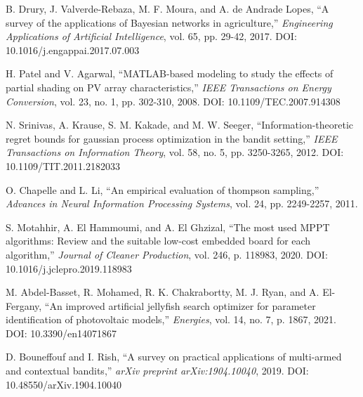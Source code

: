 \documentclass[12pt,a4paper]{article}
\begin{document}
\begin{thebibliography}{16}
B. Drury, J. Valverde-Rebaza, M. F. Moura, and A. de Andrade Lopes, ``A survey of the applications of Bayesian networks in agriculture,'' \emph{Engineering Applications of Artificial Intelligence}, vol. 65, pp. 29-42, 2017. DOI: 10.1016/j.engappai.2017.07.003

H. Patel and V. Agarwal, ``MATLAB-based modeling to study the effects of partial shading on PV array characteristics,'' \emph{IEEE Transactions on Energy Conversion}, vol. 23, no. 1, pp. 302-310, 2008. DOI: 10.1109/TEC.2007.914308

N. Srinivas, A. Krause, S. M. Kakade, and M. W. Seeger, ``Information-theoretic regret bounds for gaussian process optimization in the bandit setting,'' \emph{IEEE Transactions on Information Theory}, vol. 58, no. 5, pp. 3250-3265, 2012. DOI: 10.1109/TIT.2011.2182033

O. Chapelle and L. Li, ``An empirical evaluation of thompson sampling,'' \emph{Advances in Neural Information Processing Systems}, vol. 24, pp. 2249-2257, 2011.

S. Motahhir, A. El Hammoumi, and A. El Ghzizal, ``The most used MPPT algorithms: Review and the suitable low-cost embedded board for each algorithm,'' \emph{Journal of Cleaner Production}, vol. 246, p. 118983, 2020. DOI: 10.1016/j.jclepro.2019.118983

M. Abdel-Basset, R. Mohamed, R. K. Chakrabortty, M. J. Ryan, and A. El-Fergany, ``An improved artificial jellyfish search optimizer for parameter identification of photovoltaic models,'' \emph{Energies}, vol. 14, no. 7, p. 1867, 2021. DOI: 10.3390/en14071867

D. Bouneffouf and I. Rish, ``A survey on practical applications of multi-armed and contextual bandits,'' \emph{arXiv preprint arXiv:1904.10040}, 2019. DOI: 10.48550/arXiv.1904.10040

\end{thebibliography}
\end{document}
